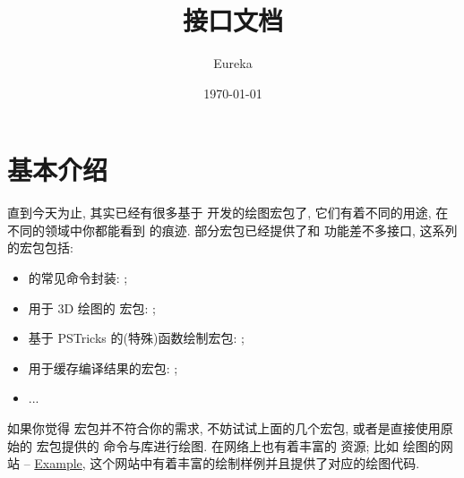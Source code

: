 \documentclass[
  hyper, lang=cn, 
  class=l3dox, 
]{../../zlatex/code/ztex}
\title{\texorpdfstring{\ztikz{} 接口文档}{zTool 接口文档}}
\author{Eureka}
\date{\today}
\begin{document}
\ExplSyntaxOn
{}
\ExplSyntaxOff
{}
  \maketitle
\restoregeometry
  \ztexslideTF{
    \thispagestyle{empty}
    \tableofcontents
  }{
    \thispagestyle{empty}
    \vspace*{-3em}
    \tableofcontents
    \clearpage
  }
\restoregeometry
\fancyheadoffset{0pt}

\section{基本介绍}
直到今天为止, 其实已经有很多基于  开发的绘图宏包了, 它们有着不同的用途, 在不同的领域中你都能看到 \TikZ{} 的痕迹. 
部分宏包已经提供了和  功能差不多接口, 这系列的宏包包括:
\begin{itemize}
  \item  \TikZ{} 的常见命令封装: \href{https://ctan.org/tex-archive/graphics/pgf/contrib/tzplot}{};
  \item 用于 3D 绘图的 \TikZ{} 宏包: \href{https://ctan.org/pkg/tikz-3dplot}{};
  \item 基于 PSTricks 的(特殊)函数绘制宏包: \href{https://ctan.org/pkg/pst-func}{};
  \item 用于缓存编译结果的宏包: \href{https://github.com/leo-colisson/robust-externalize}{};
  \item ...
\end{itemize}


如果你觉得  宏包并不符合你的需求, 不妨试试上面的几个宏包, 或者是直接使用原始的  宏包提供的
命令与库进行绘图. 在网络上也有着丰富的 \TikZ{} 资源; 比如 \TikZ{} 绘图的网站 -- 
\href{https://texample.net/tikz/examples/}{\textcolor{black}{\TikZ} Example}, 这个网站中有着丰富的绘制样例并且提供了对应的绘图代码.
\end{document}
